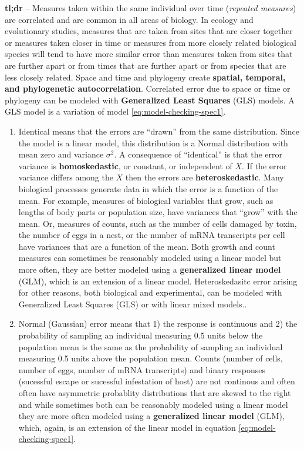 \documentclass[]{book}
\begin{document}
\textbf{tl;dr} -- Measures taken within the same individual over time (\emph{repeated measures}) are correlated and are common in all areas of biology. In ecology and evolutionary studies, measures that are taken from sites that are closer together or measures taken closer in time or measures from more closely related biological species will tend to have more similar error than measures taken from sites that are further apart or from times that are further apart or from species that are less closely related. Space and time and phylogeny create \textbf{spatial, temporal, and phylogenetic autocorrelation}. Correlated error due to space or time or phylogeny can be modeled with \textbf{Generalized Least Squares} (GLS) models. A GLS model is a variation of model \eqref{eq:model-checking-spec1}.

\begin{enumerate}
\def\labelenumi{\arabic{enumi}.}
\setcounter{enumi}{1}
\item
  Identical means that the errors are ``drawn'' from the same distribution. Since the model is a linear model, this distribution is a Normal distribution with mean zero and variance \(\sigma^2\). A consequence of ``identical'' is that the error variance is \textbf{homoskedastic}, or constant, or independent of \(X\). If the error variance differs among the \(X\) then the errors are \textbf{heteroskedastic}. Many biological processes generate data in which the error is a function of the mean. For example, measures of biological variables that grow, such as lengths of body parts or population size, have variances that ``grow'' with the mean. Or, measures of counts, such as the number of cells damaged by toxin, the number of eggs in a nest, or the number of mRNA transcripts per cell have variances that are a function of the mean. Both growth and count measures can sometimes be reasonably modeled using a linear model but more often, they are better modeled using a \textbf{generalized linear model} (GLM), which is an extension of a linear model. Heteroskedasitc error arising for other reasons, both biological and experimental, can be modeled with Generalized Least Squares (GLS) or with linear mixed models..
\item
  Normal (Gaussian) error means that 1) the response is continuous and 2) the probability of sampling an individual measuring 0.5 units below the population mean is the same as the probability of sampling an individual measuring 0.5 units above the population mean. Counts (number of cells, number of eggs, number of mRNA transcripts) and binary responses (sucessful escape or sucessful infestation of host) are not continous and often often have asymmetric probablity distributions that are skewed to the right and while sometimes both can be reasonably modeled using a linear model they are more often modeled using a \textbf{generalized linear model} (GLM), which, again, is an extension of the linear model in equation \eqref{eq:model-checking-spec1}.
\end{enumerate}
\end{document}
